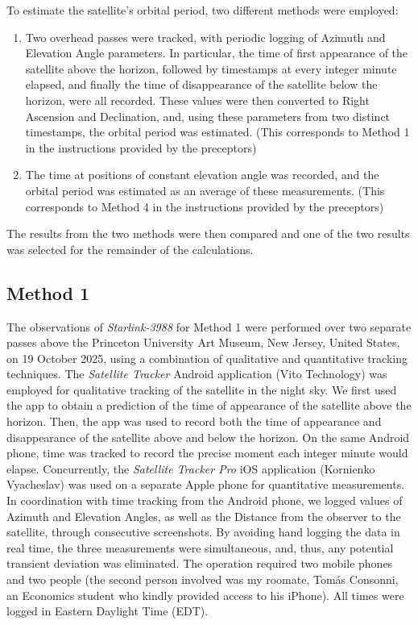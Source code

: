 \documentclass{article}
\begin{document}
To estimate the satellite's orbital period, two different methods were employed:

\begin{enumerate}
    \item Two overhead passes were tracked, with periodic logging of Azimuth and Elevation Angle parameters. In particular, the time of first appearance of the satellite above the horizon, followed by timestamps at every integer minute elapsed, and finally the time of disappearance of the satellite below the horizon, were all recorded. These values were then converted to Right Ascension and Declination, and, using these parameters from two distinct timestamps, the orbital period was estimated. (This corresponds to Method 1 in the instructions provided by the preceptors)
    \item The time at positions of constant elevation angle was recorded, and the orbital period was estimated as an average of these measurements. (This corresponds to Method 4 in the instructions provided by the preceptors)
\end{enumerate}

The results from the two methods were then compared and one of the two results was selected for the remainder of the calculations.

\subsection{Method 1}

The observations of \textit{Starlink-3988} for Method 1 were performed over two separate passes above the Princeton University Art Museum, New Jersey, United States, on 19 October 2025, using a combination of qualitative and quantitative tracking techniques. The \textit{Satellite Tracker} Android application (Vito Technology) was employed for qualitative tracking of the satellite in the night sky. We first used the app to obtain a prediction of the time of appearance of the satellite above the horizon. Then, the app was used to record both the time of appearance and disappearance of the satellite above and below the horizon. On the same Android phone, time was tracked to record the precise moment each integer minute would elapse. Concurrently, the \textit{Satellite Tracker Pro} iOS application (Kornienko Vyacheslav) was used on a separate Apple phone for quantitative measurements. In coordination with time tracking from the Android phone, we logged values of Azimuth and Elevation Angles, as well as the Distance from the observer to the satellite, through consecutive screenshots. By avoiding hand logging the data in real time, the three measurements were simultaneous, and, thus, any potential transient deviation was eliminated. The operation required two mobile phones and two people (the second person involved was my roomate, Tomás Consonni, an Economics student who kindly provided access to his iPhone). All times were logged in Eastern Daylight Time (EDT).
\end{document}
